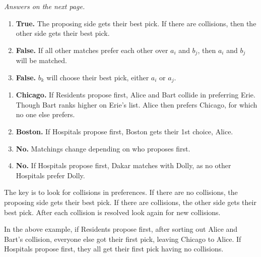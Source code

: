 \vfill
\begin{center}
    \textit{Answers on the next page.}
\end{center}

\newpage

\begin{Answer}
    \begin{enumerate}
        \item \textbf{True.} The proposing side gets their best pick. If there are collisions, then the other side gets their best pick.
        \item \textbf{False.} If all other matches prefer each other over $a_i$ and $b_j$, then $a_i$ and $b_j$ will be matched.
        \item \textbf{False.} $b_k$ will choose their best pick, either $a_i$ or $a_j$.
    \end{enumerate}
\end{Answer}

\begin{Answer}
    \begin{enumerate}
        \item \textbf{Chicago.} If Residents propose first, Alice and Bart collide in preferring Erie. Though Bart ranks higher on Erie's list. Alice then prefers Chicago, for which no one else prefers.
        \item \textbf{Boston.} If Hospitals propose first, Boston gets their 1st choice, Alice.
        \item \textbf{No.} Matchings change depending on who proposes first.
        \item \textbf{No.} If Hospitals propose first, Dakar matches with Dolly, as no other Hospitals prefer Dolly.
    \end{enumerate}
\end{Answer}

\begin{Tip} 
    The key is to look for collisions in preferences. If there are no collisions, the proposing side gets their best pick. 
    If there are collisions, the other side gets their best pick. After each collision is resolved look again for new collisions.

    In the above example, if Residents propose first, after sorting out Alice and Bart's collision, everyone else got their first pick, leaving Chicago to Alice.
    If Hospitals propose first, they all get their first pick having no collisions.
\end{Tip}

\newpage

